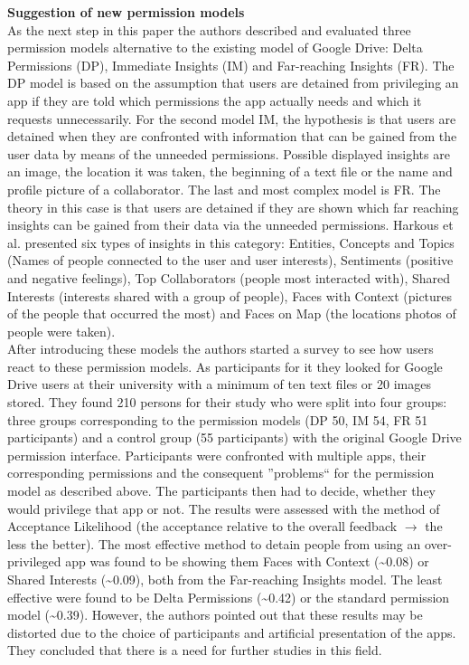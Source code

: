 \documentclass[11pt,twocolumn,a4paper,DIV=calc]{scrartcl}
\begin{document}
\textbf{Suggestion of new permission models} \\
As the next step in this paper the authors described and evaluated three permission models alternative to the existing model of Google Drive: Delta Permissions (DP), Immediate Insights (IM) and Far-reaching Insights (FR).
The DP model is based on the assumption that users are detained from privileging an app if they are told which permissions the app actually needs and which it requests unnecessarily. For the second model IM, the hypothesis is that users are detained when they are confronted with information that can be gained from the user data by means of the unneeded permissions. Possible displayed insights are an image, the location it was taken, the beginning of a text file or the name and profile picture of a collaborator. The last and most complex model is FR. The theory in this case is that users are detained if they are shown which far reaching insights can be gained from their data via the unneeded permissions. Harkous et al. presented six types of insights in this category: Entities, Concepts and Topics (Names of people connected to the user and user interests), Sentiments (positive and negative feelings), Top Collaborators (people most interacted with), Shared Interests (interests shared with a group of people), Faces with Context (pictures of the people that occurred the most) and Faces on Map (the locations photos of people were taken). \\ 
After introducing these models the authors started a survey to see how users react to these permission models. As participants for it they looked for Google Drive users at their university with a minimum of ten text files or 20 images stored. They found 210 persons for their study who were split into four groups: three groups corresponding to the permission models (DP 50, IM 54, FR 51 participants) and a control group (55 participants) with the original Google Drive permission interface. Participants were confronted with multiple apps, their corresponding permissions and the consequent ''problems`` for the permission model as described above. The participants then had to decide, whether they would privilege that app or not. The results were assessed with the method of Acceptance Likelihood (the acceptance relative to the overall feedback $\rightarrow$ the less the better). The most effective method to detain people from using an over-privileged app was found to be showing them Faces with Context (\textasciitilde 0.08) or Shared Interests (\textasciitilde 0.09), both from the Far-reaching Insights model. The least effective were found to be Delta Permissions (\textasciitilde 0.42) or the standard permission model (\textasciitilde 0.39). However, the authors pointed out that these results may be distorted due to the choice of participants and artificial presentation of the apps. They concluded that there is a need for further studies in this field. \\
\end{document}
